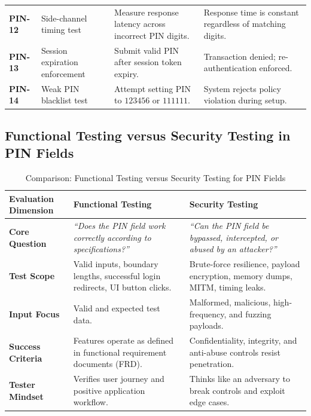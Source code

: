 \begin{table}[htbp]
\begin{tabularx}{\textwidth}{l p{4.2cm} X X}
\textbf{PIN-12} & Side-channel timing test & Measure response latency across incorrect PIN digits. & Response time is constant regardless of matching digits. \\
\textbf{PIN-13} & Session expiration enforcement & Submit valid PIN after session token expiry. & Transaction denied; re-authentication enforced. \\
\textbf{PIN-14} & Weak PIN blacklist test & Attempt setting PIN to $123456$ or $111111$. & System rejects policy violation during setup. \\
\bottomrule
\end{tabularx}
\end{table}

\subsection{Functional Testing versus Security Testing in PIN Fields}

\begin{table}[htbp]
\centering
\caption{Comparison: Functional Testing versus Security Testing for PIN Fields}
\label{tab:func_vs_sec_pin_testing}
\begin{tabularx}{\textwidth}{p{3.2cm} X X}
\toprule
\textbf{Evaluation Dimension} & \textbf{Functional Testing} & \textbf{Security Testing} \\
\midrule
\textbf{Core Question} & \textit{``Does the PIN field work correctly according to specifications?''} & \textit{``Can the PIN field be bypassed, intercepted, or abused by an attacker?''} \\
\textbf{Test Scope} & Valid inputs, boundary lengths, successful login redirects, UI button clicks. & Brute-force resilience, payload encryption, memory dumps, MITM, timing leaks. \\
\textbf{Input Focus} & Valid and expected test data. & Malformed, malicious, high-frequency, and fuzzing payloads. \\
\textbf{Success Criteria} & Features operate as defined in functional requirement documents (FRD). & Confidentiality, integrity, and anti-abuse controls resist penetration. \\
\textbf{Tester Mindset} & Verifies user journey and positive application workflow. & Thinks like an adversary to break controls and exploit edge cases. \\
\bottomrule
\end{tabularx}
\end{table}



